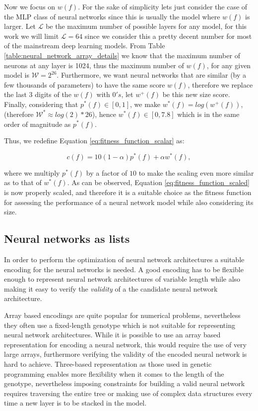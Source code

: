 \documentclass[journal]{IEEEtran}
\begin{document}
Now we focus on $w(f)$. For the sake of simplicity lets just consider the case of the MLP class of neural networks since this is usually the model where $w(f)$ is larger. Let $\mathcal{L}$ be the maximum number of possible layers for any model, for this work we will limit $\mathcal{L} = 64$ since we consider this a pretty decent number for most of the mainstream deep learning models. From Table \ref{table:neural_network_array_details} we know that the maximum number of neurons at any layer is 1024, thus the maximum number of $w(f)$, for any given model is $\mathcal{W} = 2^{26}$. Furthermore, we want neural networks that are similar (by a few thousands of parameters) to have the same score $w(f)$, therefore we replace the last 3 digits of the $w(f)$ with $0's$, let $w^+(f)$ be this new size score. Finally, considering that $p^*(f) \in \left[ 0, 1 \right]$, we make $w^*(f) = log(w^+(f))$, (therefore $\mathcal{W}^* \approx  log(2)*26$), hence $w^*(f) \in \left[0, 7.8\right]$ which is in the same order of magnitude as $p^*(f)$.

Thus, we redefine Equation \ref{eq:fitness_function_scalar} as:

\begin{equation}
c(f) = 10(1-\alpha)p^*(f) + \alpha w^*(f), 
\label{eq:fitness_function_scaled}
\end{equation}

where we multiply $p^*(f)$ by a factor of $10$ to make the scaling even more similar as to that of $w^*(f)$. As can be observed, Equation \ref{eq:fitness_function_scaled} is now properly scaled, and therefore it is a suitable choice as the fitness function for assessing the performance of a neural network model while also considering its size.


\subsection{Neural networks as lists}
\label{sec:encoding_nn}

In order to perform the optimization of neural network architectures a suitable encoding for the neural networks is needed. A good encoding has to be flexible enough to represent neural network architectures of variable length while also making it easy to verify the \textit{validity} of a the candidate neural network architecture. 

Array based encodings are quite popular for numerical problems, nevertheless they often use a fixed-length genotype which is not suitable for representing neural network architectures. While it is possible to use an array based representation for encoding a neural network, this would require the use of very large arrays, furthermore verifying the validity of the encoded neural network is hard to achieve. Three-based representation as those used in genetic programming \cite{Engelbrecht2007} enables more flexibility when it comes to the length of the genotype, nevertheless imposing constraints for building a valid neural network requires traversing the entire tree or making use of complex data structures every time a new layer is to be stacked in the model. 
\end{document}
